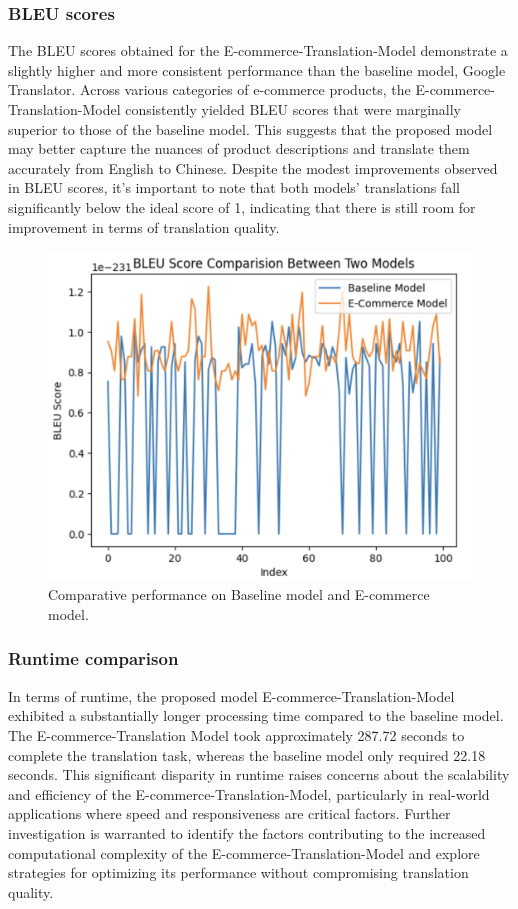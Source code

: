 \documentclass[sigconf]{acmart}
\begin{document}
\subsubsection{BLEU scores}
The BLEU scores obtained for the E-commerce-Translation-Model demonstrate a slightly higher and more consistent performance than the baseline model, Google Translator. Across various categories of e-commerce products, the E-commerce-Translation-Model consistently yielded BLEU scores that were marginally superior to those of the baseline model. This suggests that the proposed model may better capture the nuances of product descriptions and translate them accurately from English to Chinese. Despite the modest improvements observed in BLEU scores\cite{mathur_baldwin_cohn_2020}, it's important to note that both models' translations fall significantly below the ideal score of 1, indicating that there is still room for improvement in terms of translation quality.
\begin{figure}[t]
\centering
\captionsetup{justification=centering}
\includegraphics[width=1.05\columnwidth]{./Images/res.png}
\caption{Comparative performance on Baseline model and E-commerce model.}
\end{figure}

\subsubsection{Runtime comparison}
In terms of runtime, the proposed model E-commerce-Translation-Model exhibited a substantially longer processing time compared to the baseline model. The E-commerce-Translation Model took approximately 287.72 seconds to complete the translation task, whereas the baseline model only required 22.18 seconds. This significant disparity in runtime raises concerns about the scalability and efficiency of the E-commerce-Translation-Model, particularly in real-world applications where speed and responsiveness are critical factors. Further investigation is warranted to identify the factors contributing to the increased computational complexity\cite{goldreich_2008} of the E-commerce-Translation-Model and explore strategies for optimizing its performance without compromising translation quality.






 
\end{document}
